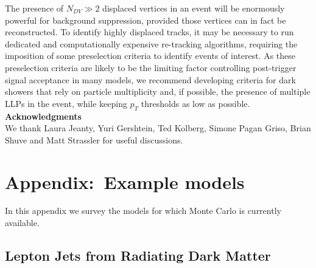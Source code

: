 The presence of $N_{DV}\gg 2$ displaced vertices in an event will be enormously powerful for background suppression, provided those vertices can in fact be reconstructed. To identify highly displaced tracks, it may be necessary to run dedicated and  computationally expensive re-tracking algorithms,  requiring the imposition of some preselection criteria to identify events of interest.   As these preselection criteria are likely to be the limiting factor controlling post-trigger signal acceptance in many models, we recommend developing criteria for dark showers that rely on particle multiplicity and, if possible,  the presence of multiple LLPs in the event, while keeping $p_T$ thresholds as low as possible.  \\

\vspace{1cm}
\textbf{Acknowledgments}\\
We thank Laura Jeanty, Yuri Gershtein, Ted Kolberg, Simone Pagan Griso, Brian Shuve and Matt Strassler for useful discussions.

\section{Appendix:~Example models}
\label{sec:darkshowermodels}
In this appendix we survey the models for which  Monte Carlo is currently available.

\subsection{Lepton Jets from Radiating Dark Matter }



